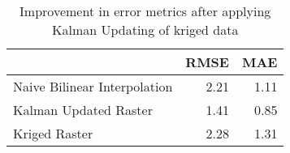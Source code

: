\begin{table}
\centering
\caption{Improvement in error metrics after applying Kalman Updating of kriged data}
\label{tab:florida_keys_gebco_raster_error}
\begin{tabular}{lrr}
\toprule
 & RMSE & MAE \\
\midrule
Naive Bilinear Interpolation & 2.21 & 1.11 \\
Kalman Updated Raster & 1.41 & 0.85 \\
Kriged Raster & 2.28 & 1.31 \\
\bottomrule
\end{tabular}
\end{table}
